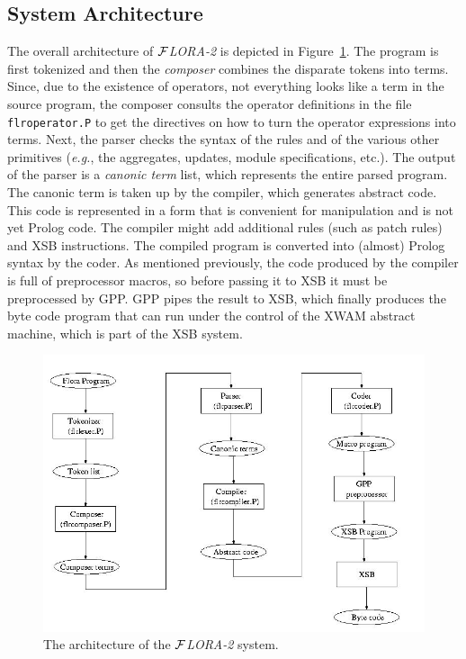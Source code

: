 \documentclass[11pt]{article}
\newcommand{\FLORA}{{\mbox{${\cal F}${\small\it LORA}\rm\emph{-2}}}\xspace}
\begin{document}
\subsection{System Architecture}

The overall architecture of \FLORA is depicted in Figure~\ref{fig-arch}.
The program is first tokenized and then the \emph{composer} combines the
disparate tokens into terms. Since, due to the existence of operators, not
everything looks like a term in the source program, the composer consults
the operator definitions in the file {\tt flroperator.P} to get the
directives on how to turn the operator expressions into terms. Next, the
parser checks the syntax of the rules and of the various other primitives
({\it e.g.}, the aggregates, updates, module specifications, etc.). The
output of the parser is a \emph{canonic term} list, which represents the
entire parsed program. The canonic term is taken up by the compiler, which
generates abstract code. This code is represented in a form that is
convenient for manipulation and is not yet Prolog code.  The compiler might
add additional rules (such as patch rules) and XSB instructions. The
compiled program is converted into (almost) Prolog syntax by the coder. As
mentioned previously, the code produced by the compiler is full of
preprocessor macros, so before passing it to XSB it must be preprocessed by
GPP. GPP pipes the result to XSB, which finally produces the byte code
program that can run under the control of the XWAM abstract machine, which
is part of the XSB system.

\begin{figure}[bt]
  \begin{center}
    \includegraphics[width=5.5in]{architecture}
  \end{center}
  \caption{The architecture of the \FLORA system.}
  \label{fig-arch}
\end{figure}
\end{document}
